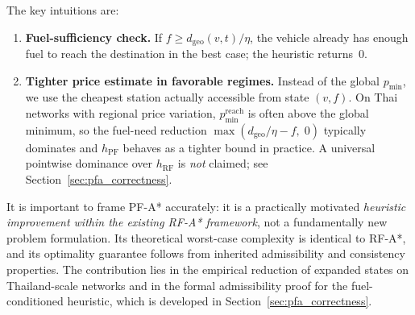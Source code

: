 The key intuitions are:
\begin{enumerate}
    \item \textbf{Fuel-sufficiency check.}
          If $f \geq d_{\mathrm{geo}}(v,t)/\eta$, the vehicle already has enough fuel to reach
          the destination in the best case; the heuristic returns~0.
    \item \textbf{Tighter price estimate in favorable regimes.}
          Instead of the global $p_{\min}$, we use the cheapest station actually accessible from
          state $(v, f)$. On Thai networks with regional price variation,
          $p_{\min}^{\mathrm{reach}}$ is often above the global minimum, so the fuel-need
          reduction $\max(d_{\mathrm{geo}}/\eta - f,\;0)$ typically dominates and
          $h_{\mathrm{PF}}$ behaves as a tighter bound in practice. A universal pointwise
          dominance over $h_{\mathrm{RF}}$ is \emph{not} claimed; see
          Section~\ref{sec:pfa_correctness}.
\end{enumerate}

It is important to frame PF-A* accurately: it is a practically motivated \emph{heuristic
improvement within the existing RF-A* framework}, not a fundamentally new problem
formulation.
Its theoretical worst-case complexity is identical to RF-A*, and its optimality guarantee
follows from inherited admissibility and consistency properties.
The contribution lies in the empirical reduction of expanded states on Thailand-scale networks
and in the formal admissibility proof for the fuel-conditioned heuristic, which is developed in
Section~\ref{sec:pfa_correctness}.
